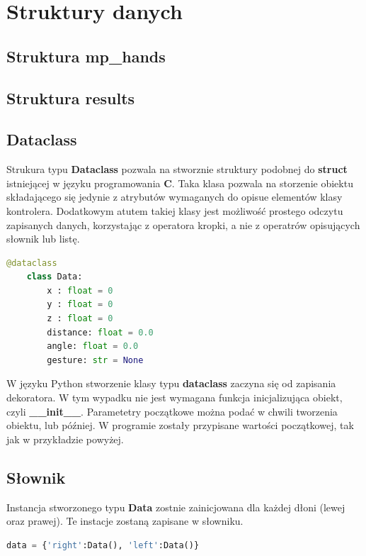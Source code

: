 \section{Struktury danych}

\subsection{Struktura mp\_hands}

\subsection{Struktura results}


\subsection{Dataclass}

\quad Strukura typu \textbf{Dataclass} pozwala na stworznie struktury podobnej do \textbf{struct} istniejącej w języku programowania \textbf{C}. Taka klasa pozwala na storzenie obiektu składającego się jedynie z atrybutów wymaganych do opisue elementów klasy kontrolera. Dodatkowym atutem takiej klasy jest możliwość prostego odczytu zapisanych danych, korzystając z operatora kropki, a nie z operatrów opisujących słownik lub listę. 

\begin{lstlisting}[language=python]
    @dataclass
    class Data:
        x : float = 0
        y : float = 0
        z : float = 0
        distance: float = 0.0
        angle: float = 0.0
        gesture: str = None
\end{lstlisting}

\quad W języku Python stworzenie klasy typu \textbf{dataclass} zaczyna się od zapisania dekoratora. W tym wypadku nie jest wymagana funkcja inicjalizująca obiekt, czyli \textbf{\_\_init\_\_}. Parametetry początkowe można podać w chwili tworzenia obiektu, lub później. W programie zostały przypisane wartości początkowej, tak jak w przykładzie powyżej. 

\subsection{Słownik}

\quad Instancja stworzonego typu \textbf{Data} zostnie zainicjowana dla każdej dłoni (lewej oraz prawej). Te instacje zostaną zapisane w słowniku. 

\begin{lstlisting}[language=python]
    data = {'right':Data(), 'left':Data()}
\end{lstlisting}

